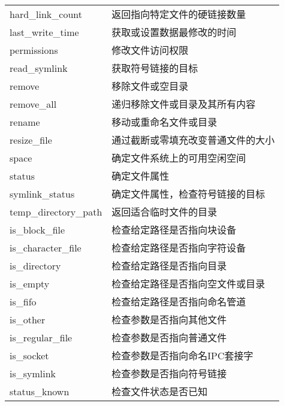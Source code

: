 \begin{longtable}{LL}
	hard\_link\_count            & 返回指向特定文件的硬链接数量           \\
	last\_write\_time            & 获取或设置数据最修改的时间             \\
	permissions                  & 修改文件访问权限                       \\
	read\_symlink                & 获取符号链接的目标                     \\
	remove                       & 移除文件或空目录                       \\
	remove\_all                  & 递归移除文件或目录及其所有内容         \\
	rename                       & 移动或重命名文件或目录                 \\
	resize\_file                 & 通过截断或零填充改变普通文件的大小     \\
	space                        & 确定文件系统上的可用空闲空间           \\
	status                       & 确定文件属性                           \\
	symlink\_status              & 确定文件属性，检查符号链接的目标       \\
	temp\_directory\_path        & 返回适合临时文件的目录                 \\
	is\_block\_file              & 检查给定路径是否指向块设备             \\
	is\_character\_file          & 检查给定路径是否指向字符设备           \\
	is\_directory                & 检查给定路径是否指向目录               \\
	is\_empty                    & 检查给定路径是否指向空文件或目录       \\
	is\_fifo                     & 检查给定路径是否指向命名管道           \\
	is\_other                    & 检查参数是否指向其他文件               \\
	is\_regular\_file            & 检查参数是否指向普通文件               \\
	is\_socket                   & 检查参数是否指向命名IPC套接字          \\
	is\_symlink                  & 检查参数是否指向符号链接               \\
	status\_known                & 检查文件状态是否已知                   \\
\end{longtable}
